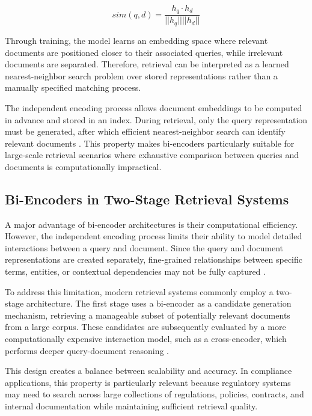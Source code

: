 \begin{equation}
sim(q,d)=
\frac{h_q \cdot h_d}
{||h_q|| ||h_d||}
\end{equation}

Through training, the model learns an embedding space where relevant documents are positioned closer to their associated queries, while irrelevant documents are separated. Therefore, retrieval can be interpreted as a learned nearest-neighbor search problem over stored representations rather than a manually specified matching process.

The independent encoding process allows document embeddings to be computed in advance and stored in an index. During retrieval, only the query representation must be generated, after which efficient nearest-neighbor search can identify relevant documents \cite{karpukhin2020dense}. This property makes bi-encoders particularly suitable for large-scale retrieval scenarios where exhaustive comparison between queries and documents is computationally impractical.

\subsection{Bi-Encoders in Two-Stage Retrieval Systems}

A major advantage of bi-encoder architectures is their computational efficiency. However, the independent encoding process limits their ability to model detailed interactions between a query and document. Since the query and document representations are created separately, fine-grained relationships between specific terms, entities, or contextual dependencies may not be fully captured \cite{nogueira2019passage}.

To address this limitation, modern retrieval systems commonly employ a two-stage architecture. The first stage uses a bi-encoder as a candidate generation mechanism, retrieving a manageable subset of potentially relevant documents from a large corpus. These candidates are subsequently evaluated by a more computationally expensive interaction model, such as a cross-encoder, which performs deeper query-document reasoning \cite{nogueira2019passage}.

This design creates a balance between scalability and accuracy. In compliance applications, this property is particularly relevant because regulatory systems may need to search across large collections of regulations, policies, contracts, and internal documentation while maintaining sufficient retrieval quality.

